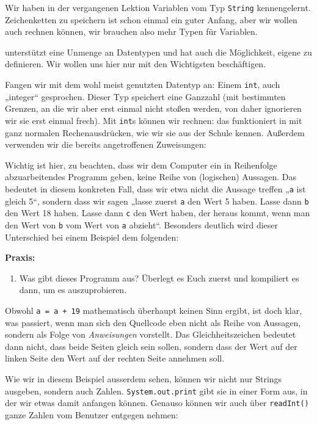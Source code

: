 
Wir haben in der vergangenen Lektion Variablen vom Typ \texttt{String}
kennengelernt. Zeichenketten zu speichern ist schon einmal ein guter Anfang,
aber wir wollen auch rechnen können, wir brauchen also mehr Typen für Variablen.

\Java unterstützt eine Unmenge an Datentypen und hat auch die Möglichkeit,
eigene zu definieren. Wir wollen uns hier nur mit den Wichtigsten beschäftigen.

Fangen wir mit dem wohl meist genutzten Datentyp an: Einem \texttt{int}, auch
„integer“ gesprochen. Dieser Typ speichert eine Ganzzahl (mit bestimmten
Grenzen, an die wir aber erst einmal nicht stoßen werden, von daher ignorieren
wir sie erst einmal frech). Mit \texttt{int}s können wir rechnen: das
funktioniert in \Java mit ganz normalen Rechenausdrücken, wie wir sie aus der
Schule kennen. Außerdem verwenden wir die bereits angetroffenen Zuweisungen:


Wichtig ist hier, zu beachten, dass wir dem Computer ein in Reihenfolge
abzuarbeitendes Programm geben, keine Reihe von (logischen) Aussagen. Das
bedeutet in diesem konkreten Fall, dass wir etwa nicht die Aussage treffen
„\texttt{a} ist gleich 5“, sondern dass wir sagen „lasse zuerst \texttt{a} den
Wert 5 haben. Lasse dann \texttt{b} den Wert 18 haben. Lasse dann \texttt{c} den
Wert haben, der heraus kommt, wenn man den Wert von \texttt{b} vom Wert
von \texttt{a} abzieht“. Besonders deutlich wird dieser Unterschied bei einem
Beispiel dem folgenden:


\textbf{Praxis:}
\begin{enumerate}
\item Was gibt dieses Programm aus? Überlegt es Euch zuerst und kompiliert es
  dann, um es auszuprobieren.
\end{enumerate}

Obwohl \texttt{a = a + 19} mathematisch überhaupt keinen Sinn ergibt, ist doch
klar, was passiert, wenn man sich den Quellcode eben nicht als Reihe von
Aussagen, sondern als Folge von \emph{Anweisungen} vorstellt. Das
Gleichheitszeichen bedeutet dann nicht, dass beide Seiten gleich sein sollen,
sondern dass der Wert auf der linken Seite den Wert auf der rechten Seite
annehmen soll.

Wie wir in diesem Beispiel ausserdem sehen, können wir nicht nur Strings
ausgeben, sondern auch Zahlen. \texttt{System.out.print} gibt sie in einer Form
aus, in der wir etwas damit anfangen können. Genauso können wir auch über
\texttt{readInt()} ganze Zahlen vom Benutzer entgegen nehmen:


